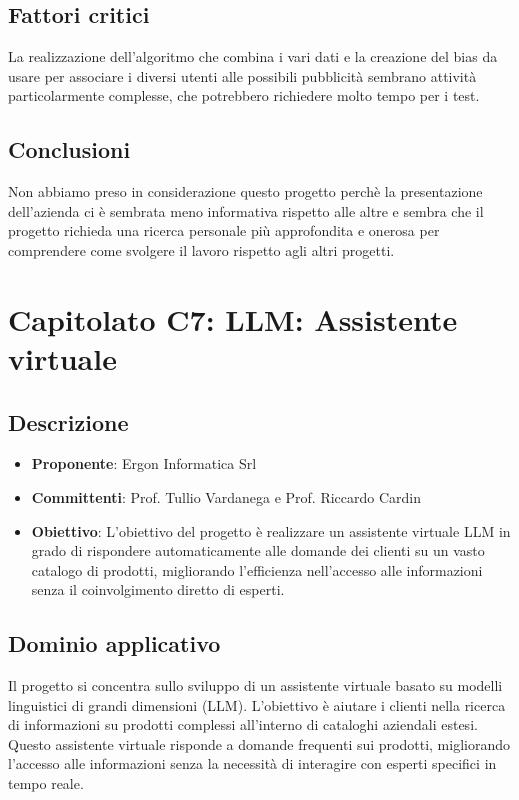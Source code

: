 \documentclass[italian, 12pt]{article}
\begin{document}
\subsection{Fattori critici}
La realizzazione dell'algoritmo che combina i vari dati e la creazione del bias da usare per associare i diversi utenti alle possibili pubblicità sembrano attività particolarmente complesse, che potrebbero richiedere molto tempo per i test.

\subsection{Conclusioni}
Non abbiamo preso in considerazione questo progetto perchè la presentazione dell’azienda ci è sembrata meno informativa rispetto alle altre e sembra che il progetto richieda una ricerca personale più approfondita e onerosa per comprendere come svolgere il lavoro rispetto agli altri progetti.

\section{Capitolato C7: LLM: Assistente virtuale}
\subsection{Descrizione}
\begin{itemize}
\item\textbf{Proponente}: Ergon Informatica Srl
\item\textbf{Committenti}: Prof. Tullio Vardanega e Prof. Riccardo Cardin
\item\textbf{Obiettivo}: L'obiettivo del progetto è realizzare un assistente virtuale LLM in grado di rispondere automaticamente alle domande dei clienti su un vasto catalogo di prodotti, migliorando l'efficienza nell'accesso alle informazioni senza il coinvolgimento diretto di esperti.
\end{itemize}

\subsection{Dominio applicativo}
Il progetto si concentra sullo sviluppo di un assistente virtuale basato su modelli linguistici di grandi dimensioni (LLM). L'obiettivo è aiutare i clienti nella ricerca di informazioni su prodotti complessi all'interno di cataloghi aziendali estesi. Questo assistente virtuale risponde a domande frequenti sui prodotti, migliorando l'accesso alle informazioni senza la necessità di interagire con esperti specifici in tempo reale.
\end{document}
